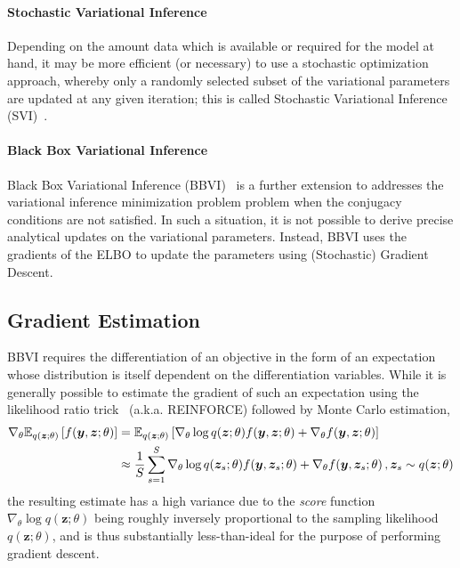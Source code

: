 \documentclass[11pt]{article}
\begin{document}
\paragraph{Stochastic Variational Inference}  Depending on the amount data
which is available or required for the model at hand, it may be more efficient
(or necessary) to use a stochastic optimization approach, whereby only
a randomly selected subset of the variational parameters are updated at any
given iteration; this is called Stochastic Variational Inference
(SVI)~\cite{hoffman_stochastic_2013}.

\paragraph{Black Box Variational Inference}  Black Box Variational Inference
(BBVI)~\cite{ranganath_black_2014} is a further extension to addresses the
variational inference minimization problem problem when the conjugacy
conditions are not satisfied.  In such a situation, it is not possible to
derive precise analytical updates on the variational parameters.  Instead, BBVI
uses the gradients of the ELBO to update the parameters using (Stochastic)
Gradient Descent.

\subsection{Gradient Estimation}\label{sec:gradient_estimation}

BBVI requires the differentiation of an objective in the form of an expectation
whose distribution is itself dependent on the differentiation variables.  While
it is generally possible to estimate the gradient of such an expectation using
the likelihood ratio trick~\cite{williams_simple_1992} (a.k.a. REINFORCE)
followed by Monte Carlo estimation,
%
\begin{align}
  \nabla_\theta {\mathbb{E}}_{q(\bm z;\theta)}\left[ f(\bm y, \bm z; \theta) \right] &=
  {\mathbb{E}}_{q(\bm z;\theta)}\left[ \nabla_\theta \log q(\bm z;\theta) f(\bm y, \bm
  z; \theta) + \nabla_\theta f(\bm y, \bm z; \theta) \right] \nonumber \\
  &\approx \frac{1}{S} \sum_{s=1}^S \nabla_\theta \log q(\bm z_s; \theta) f(\bm
  y, \bm z_s; \theta) + \nabla_\theta f(\bm y, \bm z_s; \theta) \,, \bm z_s
  \sim q(\bm z; \theta)
\end{align}
%
\noindent the resulting estimate has a high variance due to the \emph{score}
function $\nabla_\theta \log q(\bm z; \theta)$ being roughly inversely
proportional to the sampling likelihood $q(\bm z; \theta)$, and is thus
substantially less-than-ideal for the purpose of performing gradient descent.
\end{document}
